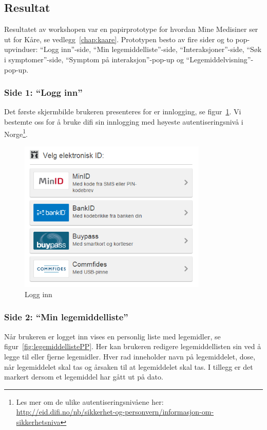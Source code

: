 \subsection{Resultat}
Resultatet av workshopen var en papirprototype for hvordan Mine Medisiner ser ut for Kåre, se vedlegg~\ref{chap:kaare}. Prototypen besto av fire sider og to pop-upvinduer: “Logg inn”-side, “Min legemiddelliste”-side, “Interaksjoner”-side, “Søk i symptomer”-side, “Symptom på interaksjon”-pop-up og “Legemiddelvisning”-pop-up. 

\pagebreak
\subsubsection{Side 1: “Logg inn”}
Det første skjermbilde brukeren presenteres for er innlogging, se figur~\ref{fig:login}. Vi bestemte oss for å bruke difi sin innlogging med høyeste autentiseringsnivå i Norge\footnote{Les mer om de ulike autentiseringsnivåene her: \url{http://eid.difi.no/nb/sikkerhet-og-personvern/informasjon-om-sikkerhetsniva}}.

\begin{figure}[H]
    \centering
    \includegraphics[width=0.8\textwidth]{fig/utviklingAvPrototype/login.PNG}
    \caption{Logg inn}
    \label{fig:login}
\end{figure} 

\subsubsection{Side 2: “Min legemiddelliste”}
Når brukeren er logget inn vises en personlig liste med legemidler, se figur~\ref{fig:legemiddellistePP}. Her kan brukeren redigere legemiddellisten sin ved å legge til eller fjerne legemidler. Hver rad inneholder navn på legemiddelet, dose, når legemiddelet skal tas og årsaken til at legemiddelet skal tas. I tillegg er det markert dersom et legemiddel har gått ut på dato. 

